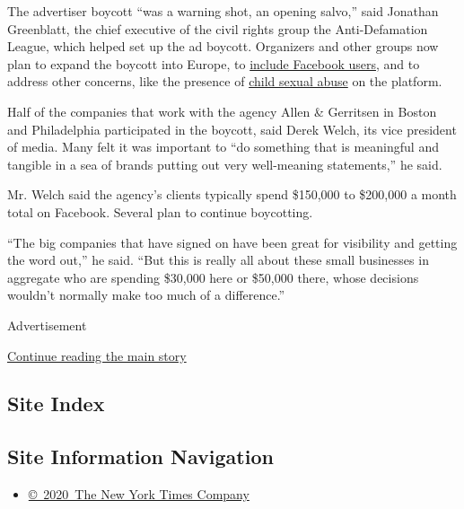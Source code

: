 The advertiser boycott ``was a warning shot, an opening salvo,'' said
Jonathan Greenblatt, the chief executive of the civil rights group the
Anti-Defamation League, which helped set up the ad boycott. Organizers
and other groups now plan to expand the boycott into Europe, to
\href{https://actions.sumofus.org/a/facebook-adblock-landing}{include
Facebook users}, and to address other concerns, like the presence of
\href{https://www.keepkidssafeonline.org/stop-hate-for-profit-facebook-pr}{child
sexual abuse} on the platform.

Half of the companies that work with the agency Allen \& Gerritsen in
Boston and Philadelphia participated in the boycott, said Derek Welch,
its vice president of media. Many felt it was important to ``do
something that is meaningful and tangible in a sea of brands putting out
very well-meaning statements,'' he said.

Mr. Welch said the agency's clients typically spend \$150,000 to
\$200,000 a month total on Facebook. Several plan to continue
boycotting.

``The big companies that have signed on have been great for visibility
and getting the word out,'' he said. ``But this is really all about
these small businesses in aggregate who are spending \$30,000 here or
\$50,000 there, whose decisions wouldn't normally make too much of a
difference.''

Advertisement

\protect\hyperlink{after-bottom}{Continue reading the main story}

\hypertarget{site-index}{%
\subsection{Site Index}\label{site-index}}

\hypertarget{site-information-navigation}{%
\subsection{Site Information
Navigation}\label{site-information-navigation}}

\begin{itemize}
\tightlist
\item
  \href{https://help.nytimes3xbfgragh.onion/hc/en-us/articles/115014792127-Copyright-notice}{©~2020~The
  New York Times Company}
\end{itemize}

